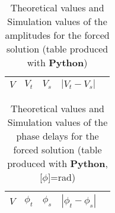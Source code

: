 \begin{table}[H]
  \centering
  \begin{tabular}{|c|c|c|c|c|}
    \hline
        $V$ & $V_t$ & $V_s$ & $|V_t-V_s|$ \\
        \hline
        \hline
        
        \hline
  \end{tabular}
  \caption{Theoretical values and Simulation values of the amplitudes for the forced solution (table produced with {\bf Python})}
  \label{error4a_res}
\end{table}

\begin{table}[H]
  \centering
  \begin{tabular}{|c|c|c|c|c|}
    \hline
        $V$ & $\phi_t$ & $\phi_s$ & $|\phi_t-\phi_s|$ \\
        \hline
        \hline
        
        \hline
  \end{tabular}
  \caption{Theoretical values and Simulation values of the phase delays for the forced solution (table produced with {\bf Python}, [$\phi$]=rad)}
  \label{error4f_res}
\end{table}

